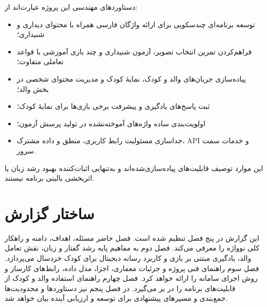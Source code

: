 دستاوردهای مهندسی این پروژه عبارت‌اند از:
\begin{itemize}
    \item توسعه برنامه‌ای چندسکویی برای ارائه واژگان فارسی همراه با محتوای دیداری و شنیداری؛
    \item فراهم‌کردن تمرین انتخاب تصویر، آزمون شنیداری و چند بازی آموزشی با قواعد تعاملی متفاوت؛
    \item پیاده‌سازی جریان‌های والد و کودک، نمایهٔ کودک و مدیریت محتوای شخصی در بخش والد؛
    \item ثبت پاسخ‌های یادگیری و پیشرفت برخی بازی‌ها برای نمایهٔ کودک؛
    \item اولویت‌بندی ساده واژه‌های آموخته‌نشده در تولید پرسش آزمون؛
    \item جداسازی مسئولیت رابط کاربری، منطق و داده مشترک، API و خدمات سمت سرور.
\end{itemize}

این موارد توصیف قابلیت‌های پیاده‌سازی‌شده‌اند و به‌تنهایی اثبات‌کننده بهبود رشد زبان یا اثربخشی بالینی برنامه نیستند.

\section{ساختار گزارش}

این گزارش در پنج فصل تنظیم شده است. فصل حاضر مسئله، اهداف، دامنه و راهکار کلی نوواژه را معرفی می‌کند. فصل دوم به مفاهیم پایه رشد گفتار و زبان، نقش تعامل والد، یادگیری مبتنی بر بازی و کاربرد رسانه دیجیتال برای کودک خردسال می‌پردازد. فصل سوم راهنمای فنی پروژه و جزئیات معماری، اجزا، مدل داده، رابط‌های کارساز و روش اجرای سامانه را ارائه خواهد کرد. فصل چهارم راهنمای استفاده والد و کودک از قابلیت‌های برنامه را در بر می‌گیرد. در فصل پنجم نیز دستاوردها و محدودیت‌ها جمع‌بندی و مسیرهای پیشنهادی برای توسعه و ارزیابی آینده بیان خواهد شد.
